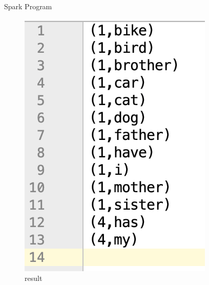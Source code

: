 \begin{frame}[plain,t]{Spark Program} %
	 \\ 
\begin{figure}
	\centering
	\includegraphics[width=0.45\linewidth]{images/dag014}
	\caption{result}
	\label{fig:dag014}
\end{figure}

\end{frame}



